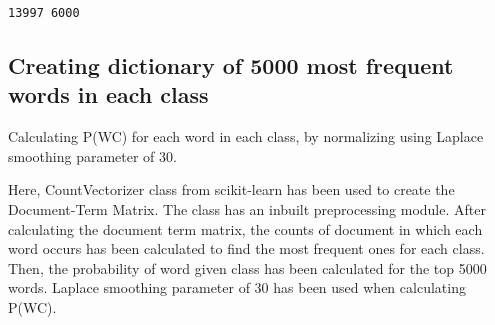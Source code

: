 \documentclass[11pt]{article}
\begin{document}
    \begin{Verbatim}[commandchars=\\\{\}]
13997 6000

    \end{Verbatim}

    \hypertarget{creating-dictionary-of-5000-most-frequent-words-in-each-class}{%
\subsection{Creating dictionary of 5000 most frequent words in each
class}\label{creating-dictionary-of-5000-most-frequent-words-in-each-class}}

    Calculating P(W\textbar{}C) for each word in each class, by normalizing
using Laplace smoothing parameter of 30.

Here, CountVectorizer class from scikit-learn has been used to create
the Document-Term Matrix. The class has an inbuilt preprocessing module.
After calculating the document term matrix, the counts of document in
which each word occurs has been calculated to find the most frequent
ones for each class. Then, the probability of word given class has been
calculated for the top 5000 words. Laplace smoothing parameter of 30 has
been used when calculating P(W\textbar{}C).
\end{document}
